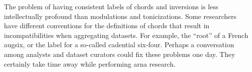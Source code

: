 
The problem of having consistent labels of chords and
inversions is less intellectually profound than modulations
and tonicizations. Some researchers have different
conventions for the definitions of chords that result in
incompatibilities when aggregating datasets. For example,
the ``root'' of a French \gls{augsix}, or the label for a
so-called cadential six-four. Perhaps a conversation among
analysts and dataset curators could fix these problems one
day. They certainly take time away while performing
\gls{arna} research.

